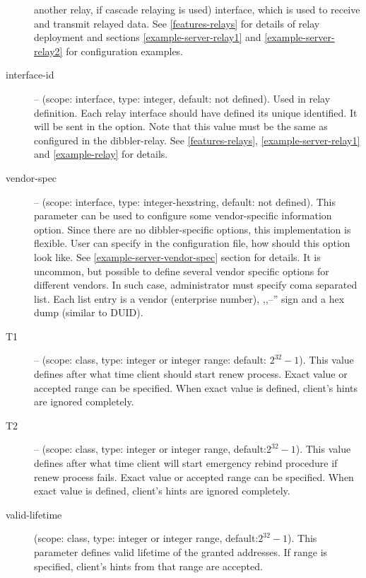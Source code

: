 \begin{description}
            another relay, if cascade relaying is used) interface,
            which is used to receive and transmit relayed data. See
            \ref{features-relays} for details of relay deployment and
            sections \ref{example-server-relay1} and
            \ref{example-server-relay2} for configuration examples. 
\item[interface-id] -- (scope: interface, type: integer, default: not
            defined). Used in relay definition. Each relay interface
            should have defined its unique identified. It will be sent
            in the  option. Note that this value
            must be the same as configured in the dibbler-relay. See
            \ref{features-relays}, \ref{example-server-relay1} and
            \ref{example-relay} for details.
 \item[vendor-spec] -- (scope: interface, type: integer-hexstring,
	    default: not defined). This parameter can be used to
	    configure some vendor-specific information option. Since
	    there are no dibbler-specific options, this implementation
	    is flexible. User can specify in the configuration file,
	    how should this option look like. See
	    \ref{example-server-vendor-spec} section for details. It
            is uncommon, but possible to define several vendor
            specific options for different vendors. In such case,
            administrator must specify coma separated list. Each list
            entry is a vendor (enterprise number), ,,--'' sign and a
            hex dump (similar to DUID).
 \item[T1] -- (scope: class, type: integer or integer range: default:
            $2^{32}-1$). This value
	    defines after what time client should start renew
	    process. Exact value or accepted range can be
            specified. When exact value is defined, client's hints are
            ignored completely. 
 \item[T2] -- (scope: class, type: integer or integer range, default:$2^{32}-1$). This value
	    defines after what time client will start emergency rebind
	    procedure if renew process fails. Exact value or accepted range can be
            specified. When exact value is defined, client's hints are
            ignored completely.
\item[valid-lifetime] (scope: class, type: integer or integer range,
	    default:$2^{32}-1$). This parameter defines valid lifetime of
	    the granted addresses. If range is specified, client's
            hints from that range are accepted.

\end{description}
